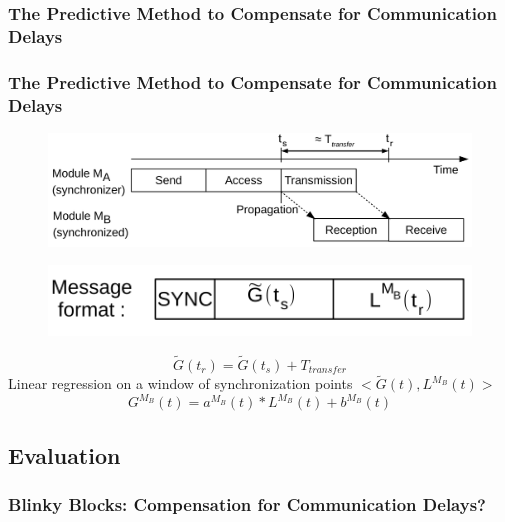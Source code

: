 \subsubsection{The Predictive Method to Compensate for Communication Delays}

\begin{frame} \frametitle{The Predictive Method to Compensate for Communication Delays}

\begin{figure}
	\centering
	\includegraphics[width=0.75\linewidth]{fig/synchronization/synchronization-timestamp}
	\label{fig:synchronization-timestamp}
\end{figure}

\begin{figure}
	\centering
	\includegraphics[width=0.5\linewidth]{fig/synchronization/synchronization-message}
	\label{fig:synchronization-message}
\end{figure}

\begin{center}
	\[
	\tilde{G}(t_r) = \tilde{G}(t_s) + T_{transfer}
	\]
	Linear regression on a window of synchronization points $<\tilde{G}(t),L^{M_B}(t)>$
	\[
	G^{M_B}(t) = a^{M_B}(t) * L^{M_B}(t) + b^{M_B}(t)
	\]
\end{center}

\end{frame}

\subsection{Evaluation}

\subsectionOutlineFrame

\subsubsection{Blinky Blocks: Compensation for Communication Delays?}

